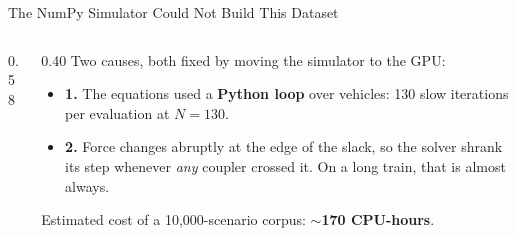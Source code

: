 \begin{frame}{The NumPy Simulator Could Not Build This Dataset}
  \vspace{-0.2em}
  \begin{columns}[T,onlytextwidth]
    \begin{column}{0.58\textwidth}
      \benchRegimeChart
      \vspace{-0.2em}
      \centering\benchLegend
    \end{column}
    \begin{column}{0.40\textwidth}
      \vspace{0.2em}
      {\footnotesize Two causes, both fixed by moving the simulator to the GPU:}
      \vspace{0.4em}

      \begin{itemize}\setlength\itemsep{0.45em}
        \item[] {\footnotesize\textbf{1.} The equations used a
              \textbf{Python loop} over vehicles: 130 slow iterations per
              evaluation at $N = 130$.}
        \item[] {\footnotesize\textbf{2.} Force changes abruptly at the edge of
              the slack, so the solver shrank its step whenever \emph{any}
              coupler crossed it. On a long train, that is
              \alert{almost always}.}
      \end{itemize}

      \vspace{0.4em}
      {\footnotesize Estimated cost of a 10,000-scenario corpus:
       \textbf{$\sim$170 CPU-hours}.}
    \end{column}
  \end{columns}
\end{frame}

